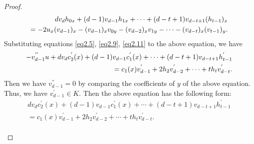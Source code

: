 \documentclass[12pt, twoside, leqno]{article}
\theoremstyle{definition}
\numberwithin{equation}{section}
\begin{document}
\begin{proof}
\begin{equation}
\begin{split}
dv_{d}h_{0x}+(d-1)v_{d-1}h_{1x}+\cdots+(d-t+1)v_{d-t+1}(h_{t-1})_x\notag\\=-2u_{x}(v_{d-1})_x-(v_{d-1})_xv_{0y}-(v_{d-2})_xv_{1y}-\cdots-(v_{d-t})_x(v_{t-1})_y.
\end{split}
\end{equation}
Substituting equations \eqref{eq2.5}, \eqref{eq2.9}, \eqref{eq2.11} to the above equation, we have
\begin{equation}
\begin{split}
-v_{d-1}^{''}u+dv_{d}c_{2}^{'}(x)+(d-1)v_{d-1}c_{1}^{'}(x)+\cdots+(d-t+1)v_{d-t+1}h_{t-1}^{'}\notag\\=c_{1}(x)v_{d-1}^{'}+2h_{2}v_{d-2}^{'}+\cdots+th_{t}v_{d-t}^{'}.
\end{split}
\end{equation}
Then we have $v_{d-1}^{''}=0$ by comparing the coefficients of $y$ of the above equation. Thus, we have $v_{d-1}^{'}\in K$. Then the above equation has the following form:
\begin{equation}\label{eq2.15}
\begin{split}
dv_{d}c_{2}^{'}(x)+(d-1)v_{d-1}c_{1}^{'}(x)+\cdots+(d-t+1)v_{d-t+1}h_{t-1}^{'}\\=c_{1}(x)v_{d-1}^{'}+2h_{2}v_{d-2}^{'}+\cdots+th_{t}v_{d-t}^{'}.
\end{split}
\end{equation}\\


\end{proof}
\end{document}
